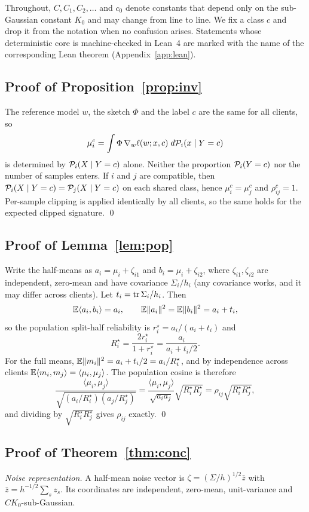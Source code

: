 Throughout, $C,C_1,C_2,\dots$ and $c_0$ denote constants that depend only on the sub-Gaussian constant $K_0$ and may change from line to line. We fix a class $c$ and drop it from the notation when no confusion arises. Statements whose deterministic core is machine-checked in Lean~4 are marked with the name of the corresponding Lean theorem (Appendix~\ref{app:lean}).

\subsection{Proof of Proposition~\ref{prop:inv}}
The reference model $w$, the sketch $\Phi$ and the label $c$ are the same for all clients, so
\[
\mu_i^c=\int \Phi\,\nabla_w\ell(w;x,c)\;d\mathcal{P}_i(x\mid Y=c)
\]
is determined by $\mathcal{P}_i(X\mid Y=c)$ alone. Neither the proportion $\mathcal{P}_i(Y=c)$ nor the number of samples enters. If $i$ and $j$ are compatible, then $\mathcal{P}_i(X\mid Y=c)=\mathcal{P}_j(X\mid Y=c)$ on each shared class, hence $\mu_i^c=\mu_j^c$ and $\rho^c_{ij}=1$. Per-sample clipping is applied identically by all clients, so the same holds for the expected clipped signature. \qed

\subsection{Proof of Lemma~\ref{lem:pop}}
Write the half-means as $a_i=\mu_i+\zeta_{i1}$ and $b_i=\mu_i+\zeta_{i2}$, where $\zeta_{i1},\zeta_{i2}$ are independent, zero-mean and have covariance $\Sigma_i/h_i$ (any covariance works, and it may differ across clients). Let $t_i=\operatorname{tr}\Sigma_i/h_i$. Then
\[
\mathbb{E}\langle a_i,b_i\rangle=a_i,
\qquad
\mathbb{E}\|a_i\|^2=\mathbb{E}\|b_i\|^2=a_i+t_i,
\]
so the population split-half reliability is $r_i^\star=a_i/(a_i+t_i)$ and
\[
R_i^\star=\frac{2r_i^\star}{1+r_i^\star}=\frac{a_i}{a_i+t_i/2}.
\]
For the full means, $\mathbb{E}\|m_i\|^2=a_i+t_i/2=a_i/R_i^\star$, and by independence across clients $\mathbb{E}\langle m_i,m_j\rangle=\langle\mu_i,\mu_j\rangle$. The population cosine is therefore
\[
\frac{\langle\mu_i,\mu_j\rangle}{\sqrt{(a_i/R_i^\star)(a_j/R_j^\star)}}
=\frac{\langle\mu_i,\mu_j\rangle}{\sqrt{a_ia_j}}\sqrt{R^\star_iR^\star_j}
=\rho_{ij}\sqrt{R^\star_iR^\star_j},
\]
and dividing by $\sqrt{R_i^\star R_j^\star}$ gives $\rho_{ij}$ exactly. \qed

\subsection{Proof of Theorem~\ref{thm:conc}}
\emph{Noise representation.} A half-mean noise vector is $\zeta=(\Sigma/h)^{1/2}\bar z$ with $\bar z=h^{-1/2}\sum_{s}z_s$. Its coordinates are independent, zero-mean, unit-variance and $CK_0$-sub-Gaussian.

